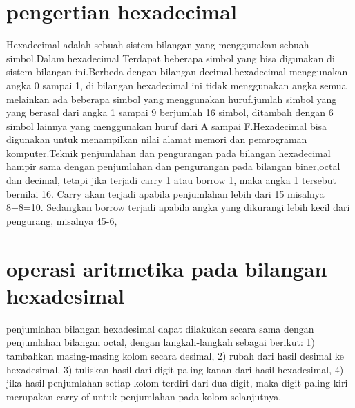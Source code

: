 \section{pengertian hexadecimal}
Hexadecimal adalah sebuah sistem bilangan yang menggunakan sebuah simbol.Dalam hexadecimal Terdapat beberapa simbol yang bisa digunakan di sistem bilangan ini.Berbeda dengan bilangan decimal.hexadecimal menggunakan angka 0 sampai 1, di bilangan hexadecimal ini tidak menggunakan angka semua melainkan ada beberapa simbol yang menggunakan huruf.jumlah simbol yang yang berasal dari angka 1 sampai 9 berjumlah 16 simbol, ditambah dengan 6 simbol lainnya yang menggunakan huruf dari A sampai F.Hexadecimal bisa digunakan untuk menampilkan nilai alamat memori dan pemrograman komputer.Teknik penjumlahan dan pengurangan pada bilangan hexadecimal hampir sama dengan penjumlahan dan pengurangan pada bilangan biner,octal dan decimal, tetapi jika terjadi carry 1 atau borrow 1, maka angka 1 tersebut bernilai 16. Carry akan terjadi apabila penjumlahan lebih dari 15 misalnya 8+8=10. Sedangkan borrow terjadi apabila angka yang dikurangi lebih kecil dari pengurang, misalnya 45-6,
\section {operasi aritmetika pada bilangan hexadesimal}
penjumlahan bilangan hexadesimal dapat dilakukan secara sama dengan penjumlahan bilangan octal, dengan langkah-langkah sebagai berikut: 1) tambahkan masing-masing kolom secara desimal, 2) rubah dari hasil desimal ke hexadesimal, 3) tuliskan hasil dari digit paling kanan dari hasil hexadesimal, 4) jika hasil penjumlahan setiap kolom terdiri dari dua digit, maka digit paling kiri merupakan carry of untuk penjumlahan pada kolom selanjutnya.